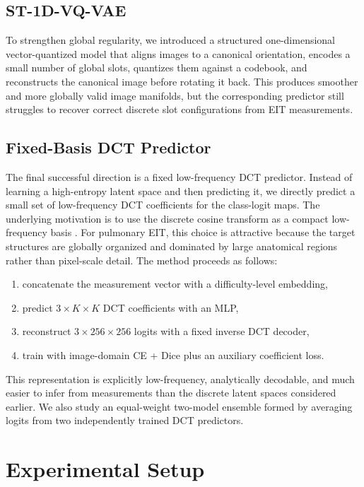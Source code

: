 \documentclass[11pt,a4paper]{article}
\begin{document}
\subsection{ST-1D-VQ-VAE}
To strengthen global regularity, we introduced a structured one-dimensional vector-quantized model that aligns images to a canonical orientation, encodes a small number of global slots, quantizes them against a codebook, and reconstructs the canonical image before rotating it back. This produces smoother and more globally valid image manifolds, but the corresponding predictor still struggles to recover correct discrete slot configurations from EIT measurements.

\subsection{Fixed-Basis DCT Predictor}
The final successful direction is a fixed low-frequency DCT predictor. Instead of learning a high-entropy latent space and then predicting it, we directly predict a small set of low-frequency DCT coefficients for the class-logit maps. The underlying motivation is to use the discrete cosine transform as a compact low-frequency basis \cite{ahmed1974dct}. For pulmonary EIT, this choice is attractive because the target structures are globally organized and dominated by large anatomical regions rather than pixel-scale detail. The method proceeds as follows:
\begin{enumerate}[leftmargin=1.5em]
    \item concatenate the measurement vector with a difficulty-level embedding,
    \item predict $3\times K\times K$ DCT coefficients with an MLP,
    \item reconstruct $3\times 256\times 256$ logits with a fixed inverse DCT decoder,
    \item train with image-domain CE + Dice plus an auxiliary coefficient loss.
\end{enumerate}

This representation is explicitly low-frequency, analytically decodable, and much easier to infer from measurements than the discrete latent spaces considered earlier. We also study an equal-weight two-model ensemble formed by averaging logits from two independently trained DCT predictors.

\section{Experimental Setup}
\end{document}
